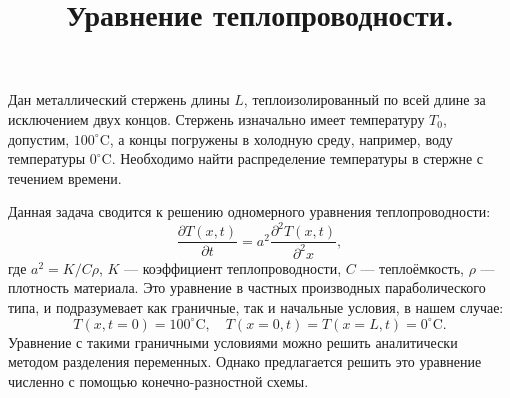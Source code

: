 \documentclass[12pt]{article}
\title{Уравнение теплопроводности.}
\author{}
\date{}
\begin{document}
\maketitle

Дан металлический стержень длины $L$, теплоизолированный по всей длине за исключением двух концов. Стержень изначально имеет температуру $T_0$, допустим, $100^\circ \mathrm{C}$, а концы погружены в холодную среду, например, воду температуры $0^\circ \mathrm{C}$. Необходимо найти распределение температуры в стержне с течением времени.

Данная задача сводится к решению одномерного уравнения теплопроводности:
%
\begin{equation}
\frac{\partial T(x, t)}{\partial t}=a^2\frac{\partial^2 T(x, t)}{\partial^2 x},
\label{eq:heat}
\end{equation}
%
где $a^2=K/C\rho$, $K$ --- коэффициент теплопроводности, $C$ --- теплоёмкость, $\rho$ --- плотность материала. Это уравнение в частных производных параболического типа, и подразумевает как граничные, так и начальные условия, в нашем случае:
%
\begin{equation}
T(x,t=0)=100^\circ\mathrm{C},\quad T(x=0,t)=T(x=L,t)=0^\circ\mathrm{C}.
\end{equation}
Уравнение с такими граничными условиями можно решить аналитически методом разделения переменных. Однако предлагается решить это уравнение численно с помощью конечно-разностной схемы.
\end{document}
